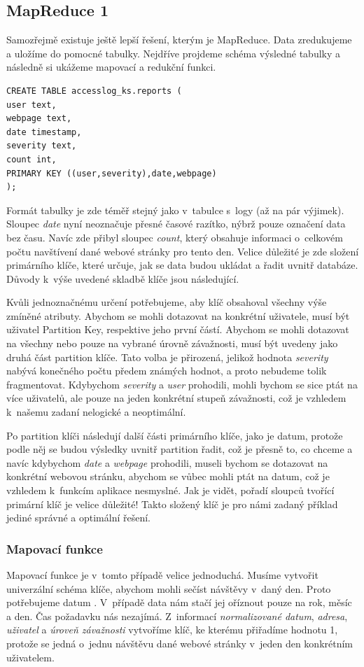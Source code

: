 \subsection{MapReduce 1}
Samozřejmě existuje ještě lepší řešení, kterým je MapReduce. Data zredukujeme a uložíme do pomocné tabulky. Nejdříve projdeme schéma výsledné tabulky a následně si ukážeme mapovací a redukční funkci.

\begin{lstlisting}[caption={Tabulka pro ukládání reportů},label=ReportTable]
CREATE TABLE accesslog_ks.reports ( 
user text,
webpage text,
date timestamp,
severity text,
count int,
PRIMARY KEY ((user,severity),date,webpage) 
);
\end{lstlisting}

Formát tabulky je zde téměř stejný jako v~tabulce s~logy (až na pár výjimek). Sloupec \emph{date} nyní neoznačuje přesné časové razítko, nýbrž pouze označení data bez času. Navíc zde přibyl sloupec \emph{count}, který obsahuje informaci o~celkovém počtu navštívení dané webové stránky pro tento den. Velice důležité je zde složení primárního klíče, které určuje, jak se data budou ukládat a řadit uvnitř databáze. Důvody k~výše uvedené skladbě klíče jsou následující. 

Kvůli jednoznačnému určení potřebujeme, aby klíč obsahoval všechny výše zmíněné atributy. Abychom se mohli dotazovat na konkrétní uživatele, musí být uživatel Partition Key, respektive jeho první částí. Abychom se mohli dotazovat na všechny nebo pouze na vybrané úrovně závažnosti, musí být uvedeny jako druhá část partition klíče. Tato volba je přirozená, jelikož hodnota \emph{severity} nabývá konečného počtu předem známých hodnot, a proto nebudeme tolik fragmentovat. Kdybychom \emph{severity} a \emph{user} prohodili, mohli bychom se sice ptát na více uživatelů, ale pouze na jeden konkrétní stupeň závažnosti, což je vzhledem k~našemu zadaní nelogické a neoptimální.

Po partition klíči následují další části primárního klíče, jako je datum, protože podle něj se budou výsledky uvnitř partition řadit, což je přesně to, co chceme a navíc kdybychom \emph{date} a \emph{webpage} prohodili, museli bychom se dotazovat na konkrétní webovou stránku, abychom se vůbec mohli ptát na datum, což je vzhledem k~funkcím aplikace nesmyslné. Jak je vidět, pořadí sloupců tvořící primární klíč je velice důležité! Takto složený klíč je pro námi zadaný příklad jediné správné a optimální řešení.

\subsubsection{Mapovací funkce}
Mapovací funkce je v~tomto případě velice jednoduchá. Musíme vytvořit univerzální schéma klíče, abychom mohli sečíst návštěvy v~daný den. Proto potřebujeme datum . V~případě data nám stačí jej oříznout pouze na rok, měsíc a den. Čas požadavku nás nezajímá. Z~informací \emph{normalizované datum}, \emph{adresa}, \emph{uživatel} a \emph{úroveň závažnosti} vytvoříme klíč, ke kterému přiřadíme hodnotu 1, protože se jedná o~jednu návštěvu dané webové stránky v~jeden den konkrétním uživatelem. 

